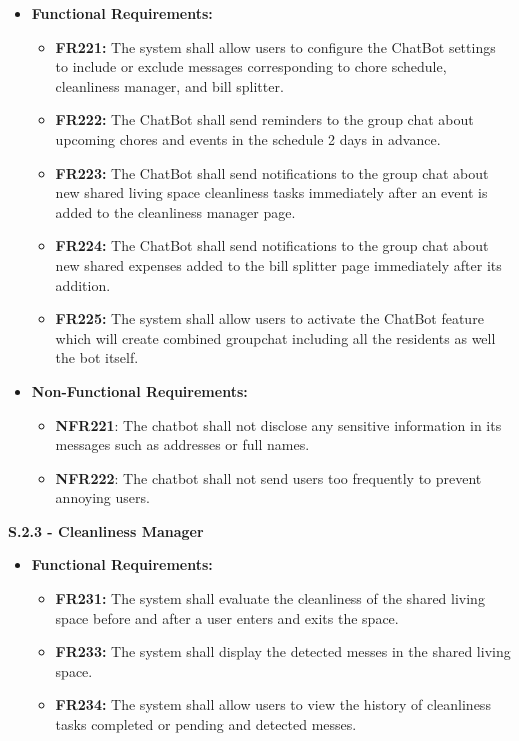 \documentclass{scrreprt}
\theoremstyle{definition}
\begin{document}
\begin{flushleft}
  	\begin{itemize}
  		\item \textbf{Functional Requirements:}
  		\begin{itemize}
  			\item \textbf{FR221:} The system shall allow users to configure the ChatBot settings to include or exclude messages corresponding to chore schedule, cleanliness manager, and bill splitter.
            \item \textbf{FR222:} The ChatBot shall send reminders to the group chat about upcoming chores and events in the schedule 2 days in advance.
            \item \textbf{FR223:} The ChatBot shall send notifications to the group chat about new shared living space cleanliness tasks immediately after an event is added to the cleanliness manager page.
            \item \textbf{FR224:} The ChatBot shall send notifications to the group chat about new shared expenses added to the bill splitter page immediately after its addition.
            \item \textbf{FR225:} The system shall allow users to activate the ChatBot feature which will create combined groupchat including all the residents as well the bot itself.
  		\end{itemize}
  		\item \textbf{Non-Functional Requirements:}
  		\begin{itemize}
  			\item \textbf{NFR221}: The chatbot shall not disclose any sensitive information in its messages such as addresses or full names.
  			\item \textbf{NFR222}: The chatbot shall not send users too frequently to prevent annoying users.
  		\end{itemize}
  	\end{itemize}
  	\item \textbf{S.2.3 - Cleanliness Manager}
  	\begin{itemize}
  		\item \textbf{Functional Requirements:}
  		\begin{itemize}
            \item \textbf{FR231:} The system shall evaluate the cleanliness of the shared living space before and after a user enters and exits the space.
            \item \textbf{FR233:} The system shall display the detected messes in the shared living space.
            \item \textbf{FR234:} The system shall allow users to view the history of cleanliness tasks completed or pending and detected messes.

\end{itemize}
\end{itemize}
\end{flushleft}
\end{document}
